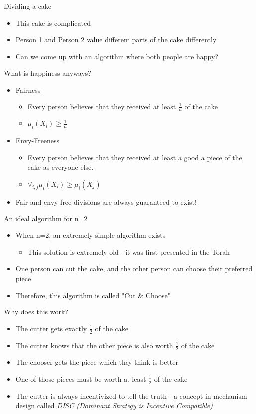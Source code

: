 \documentclass[t]{beamer}
\newcommand{\ite}{\item[\ding{118}]}
\begin{document}
\begin{frame}{Dividing a cake}
	\begin{itemize}
		\ite This cake is complicated
		\ite Person 1 and Person 2 value different parts of the cake differently
		\ite Can we come up with an algorithm where both people are happy?
	\end{itemize}
\end{frame}
\begin{frame}{What is happiness anyways?}
	\begin{itemize}
		\ite Fairness
		\begin{itemize}
			\ite Every person believes that they received at least $\frac{1}{n}$ of the cake
			\ite $\mu_i(X_i)\geq \frac{1}{n}$
		\end{itemize}	
		\ite Envy-Freeness	
		\begin{itemize}
			\ite Every person believes that they received at least a good a piece of the cake as everyone else. 
			\ite $\forall_{i,j} \mu_i(X_i)\geq \mu_i(X_j)$
		\end{itemize}
		\ite Fair and envy-free divisions are always guaranteed to exist!
	\end{itemize}
\end{frame}
\begin{frame}{An ideal algorithm for n=2}
	\begin{itemize}
		\ite When n=2, an extremely simple algorithm exists
		\begin{itemize}
			\ite This solution is extremely old - it was first presented in the Torah
		\end{itemize}
		\ite One person can cut the cake, and the other person can choose their preferred piece
		\ite Therefore, this algorithm is called "Cut \& Choose"
	\end{itemize}
\end{frame}

\begin{frame}{Why does this work?}
	\begin{itemize}
		\ite The cutter gets exactly $\frac{1}{2}$ of the cake
		\ite The cutter knows that the other piece is also worth $\frac{1}{2}$ of the cake
		\ite The chooser gets the piece which they think is better
		\ite One of those pieces must be worth at least $\frac{1}{2}$ of the cake
		
		\ite The cutter is always incentivized to tell the truth - a concept in mechanism design called \textit{DISC (Dominant Strategy is Incentive Compatible)}
	\end{itemize}
\end{frame}
\end{document}
